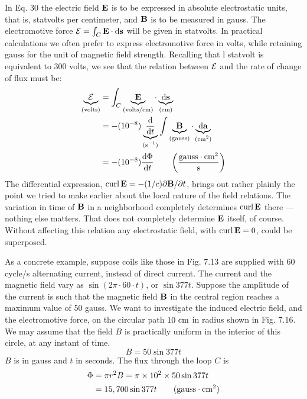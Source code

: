 In Eq. 30 the electric field $\mathbf{E}$ is to be expressed in absolute electrostatic
units, that is, statvolts per centimeter, and $\mathbf{B}$ is to be measured
in gauss. The electromotive force $\mathcal{E} = \int_C \mathbf{E}\cdot\textup{d}\mathbf{s}$ will be given in statvolts.
In practical calculations we often prefer to express electromotive
force in volts, while retaining gauss for the unit of magnetic
field strength. Recalling that l statvolt is equivalent to 300 volts,
we see that the relation between $\mathcal{E}$ and the rate of change of flux
must be:
\begin{align}
\begin{split}
  \underbrace{\mathcal{E}}_\text{(volts)} 
  &= \int_C \underbrace{\mathbf{E}}_\text{(volts/cm)}\cdot\underbrace{\textup{d}\mathbf{s}}_\text{(cm)} \\
  &= -(10^{-8}) \underbrace{\frac{\textup{d}}{\textup{d} t}}_\text{($\textup{s}^{-1}$)}
    \int \underbrace{\mathbf{B}}_\text{(gauss)}
    \cdot \underbrace{\textup{d}\mathbf{a}}_\text{($\textup{cm}^2$)} \\
  &= -(10^{-8})\frac{\textup{d}\Phi}{\textup{d} t} \qquad \left(\frac{\textup{gauss}\cdot\textup{cm}^2}{\textup{s}}\right)
\end{split}
\end{align}
The differential expression, $\operatorname{curl}\mathbf{E} = - (1/c) \partial\mathbf{B}/\partial t$, brings out
rather plainly the point we tried to make earlier about the local nature
of the field relations. The variation in time of $\mathbf{B}$ in a neighborhood
completely determines $\operatorname{curl}\mathbf{E}$ there --- nothing else matters. That
does not completely determine $\mathbf{E}$ itself, of course. Without affecting
this relation any electrostatic field, with $\operatorname{curl}\mathbf{E} = 0$, could be
superposed.

As a concrete example, suppose coils like those in Fig. 7.13 are
supplied with 60 cycle/s alternating current, instead of direct
current. The current and the magnetic field vary as $\sin (2\pi\cdot 60\cdot t)$,
or $\sin 377t$. Suppose the amplitude of the current is such that the
magnetic field $\mathbf{B}$ in the central region reaches a maximum value of
50 gauss. We want to investigate the induced electric field, and the
electromotive force, on the circular path $10\ \textup{cm}$ in radius shown in
Fig. 7.16. We may assume that the field $B$ is practically uniform in
the interior of this circle, at any instant of time.
\begin{equation}
  B = 50 \sin 377t
\end{equation}
$B$ is in gauss and $t$ in seconds. The flux through the loop $C$ is
\begin{align}
  \Phi &= \pi r^2 B = \pi \times 10^2 \times 50\sin 377 t \\
       &= 15,700 \sin 377 t \qquad \text{($\textup{gauss}\cdot\textup{cm}^2$)}
\end{align}

